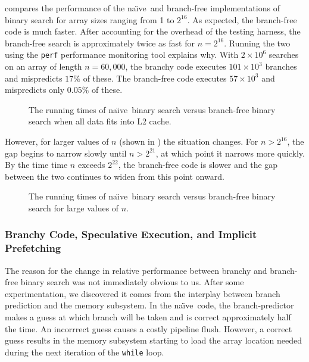 \documentclass{patmorin}
\newcommand{\naive}{na\"{\i}ve}
\begin{document}
 compares the performance of the \naive\ and
branch-free implementations of binary search for array sizes ranging from
1 to $2^{16}$.  As expected, the branch-free code is much faster. After
accounting for the overhead of the testing harness, the branch-free
search is approximately twice as fast for $n=2^{16}$.  Running the two
using the \texttt{perf} performance monitoring tool explains
why.  With $2\times 10^6$ searches on an array of length
$n=60,000$, the branchy code executes $101\times 10^3$ branches and
mispredicts $17\%$ of these.  The branch-free code executes $57\times
10^3$ and mispredicts only $0.05\%$ of these.

\begin{figure}
   \caption{The running times of \naive\ binary search versus
    branch-free binary search when all data
    fits into L2 cache.}
\end{figure}

However, for larger values of $n$ (shown in ) the
situation changes.  For $n>2^{16}$, the gap begins to narrow slowly
until $n>2^{21}$, at which point it narrows more quickly.  By the time
time $n$ exceeds $2^{22}$, the branch-free code is slower and the gap
between the two continues to widen from this point onward.

\begin{figure}
   \caption{The running times of \naive\ binary search versus
    branch-free binary search for large values of $n$.}
\end{figure}

\subsubsection{Branchy Code, Speculative Execution, and Implicit Prefetching}

The reason for the change in relative performance between branchy
and branch-free binary search was not immediately obvious to us.
After some experimentation, we discovered it comes from the interplay
between branch prediction and the memory subsystem.  In the \naive\
code, the branch-predictor makes a guess at which branch will be taken
and is correct approximately half the time. An incorrrect guess causes a
costly pipeline flush.  However, a correct guess results in the memory
subsystem starting to load the array location needed during the next
iteration of the \texttt{while} loop.
\end{document}
